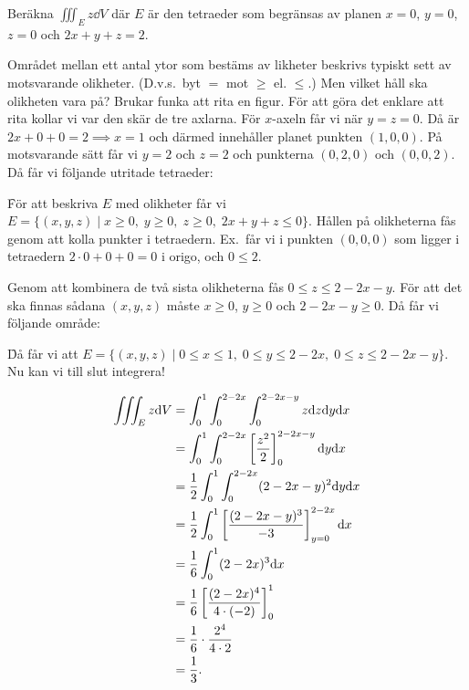 \documentclass[a4paper]{article}
\begin{document}
\begin{ex}
    Beräkna \(
        \iiint_E z \dd V
    \) där \(
        E 
    \) är den tetraeder som begränsas av planen \(
        x = 0
    \), \(
        y = 0
    \), \(
        z = 0
    \) och \(
        2x + y + z = 2
    \).

    Området mellan ett antal ytor som bestäms av likheter beskrivs typiskt 
    sett av motsvarande olikheter. (D.v.s.\ byt \(
        =
    \) mot \(
        \geq \text{ el. } \leq
    \).) Men vilket håll ska olikheten vara på? Brukar funka att rita en 
    figur. För att göra det enklare att rita kollar vi var den skär de tre axlarna.
    För \(
        x
    \)-axeln får vi när \(
        y = z = 0
    \). Då är \(
        2x + 0 + 0 = 2 \implies x = 1
    \) och därmed innehåller planet punkten \(
        (1,0,0)
    \). På motsvarande sätt får vi \(
        y = 2
    \) och \(
        z = 2
    \) och punkterna \(
        (0,2,0)
    \) och \(
        (0,0,2)
    \). Då får vi följande utritade tetraeder: 

    \f

    För att beskriva \(
        E
    \) med olikheter får vi \(
        E = \{ (x,y,z) \; | \; x \geq 0,\; y \geq 0,\; z \geq 0,\; 2x+y+z \leq 0 \}
    \). Hållen på olikheterna fås genom att kolla punkter i tetraedern. 
    Ex.\ får vi i punkten \(
        (0,0,0)
    \) som ligger i tetraedern \(
        2\cdot 0 + 0 + 0 = 0 
    \) i origo, och \(
        0 \leq 2
    \).

    Genom att kombinera de två sista olikheterna fås \(
        0 \leq z \leq 2 - 2x - y
    \). För att det ska finnas sådana \(
        (x,y,z)
    \) måste \(
        x \geq 0
    \), \(
        y \geq 0 
    \) och \(
        2-2x-y \geq 0
    \). Då får vi följande område:

    \f

    Då får vi att \(
        E = \{ (x,y,z) \; | \; 0 \leq x \leq 1, \; 0 \leq y \leq 2 - 2x, \; 0 \leq z \leq 2 - 2x - y \}
    \). Nu kan vi till slut integrera! 

    \begin{align*}
        \iiint_E z \dd V &= \int_0^1 \int_0^{2-2x} \int_0^{2-2x-y} z \dd z \dd y \dd x \\
                         &= \int_0^1 \int_0^{2-2x} \left[\frac{z^2}{2} \right]_0^{2-2x-y} \dd y \dd x \\
                         &= \frac{1}{2} \int_0^1 \int_0^{2-2x} (2-2x-y)^2 \dd y \dd x \\
                         &= \frac{1}{2} \int_0^1 \left[ \frac{(2-2x-y)^3}{-3} \right]_{y = 0}^{2-2x} \dd x \\
                         &= \frac{1}{6} \int_0^1 (2-2x)^3 \dd x \\
                         &= \frac{1}{6} \left[ \frac{(2-2x)^4}{4\cdot(-2)} \right]_0^1 \\
                         &= \frac{1}{6} \cdot \frac{2^4}{4\cdot 2} \\
                         &= \frac{1}{3}.
    \end{align*}
\end{ex}
\end{document}
